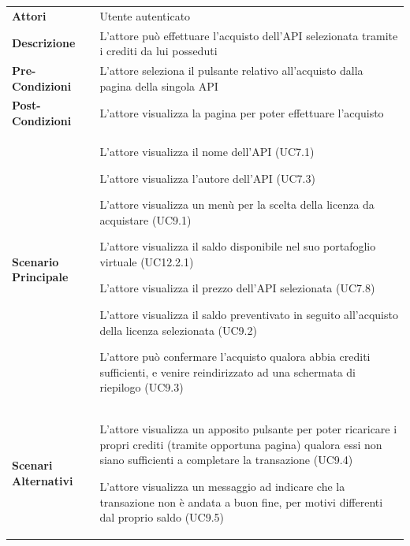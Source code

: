 \begin{longtable}{ l | p{11cm}}
	\hline
	\rowcolor{Gray}
	\multicolumn{2}{c}{UC9 - Acquisto API}\\
	\hline
	
	 \textbf{Attori} & Utente autenticato  \\
	\textbf{Descrizione} & L'attore può effettuare l'acquisto dell'API selezionata tramite i crediti da lui posseduti \\
	\textbf{Pre-Condizioni} & L'attore seleziona il pulsante relativo all'acquisto dalla pagina della singola API  \\
	\textbf{Post-Condizioni} & L'attore visualizza la pagina per poter effettuare l'acquisto\\
	\textbf{Scenario Principale} & 
	\begin{enumerate*}[label=(\arabic*.),itemjoin={\newline}]
		\item L'attore visualizza il nome dell'API (UC7.1)
		\item L'attore visualizza l'autore dell'API (UC7.3)
		\item L'attore visualizza un menù per la scelta della licenza da acquistare (UC9.1)
		\item L'attore visualizza il saldo disponibile nel suo portafoglio virtuale (UC12.2.1)
		\item L'attore visualizza il prezzo dell'API selezionata (UC7.8)
		\item L'attore visualizza il saldo preventivato in seguito all'acquisto della licenza selezionata (UC9.2)
		\item L'attore può confermare l'acquisto qualora abbia crediti sufficienti, e venire reindirizzato ad una schermata di riepilogo (UC9.3)
	\end{enumerate*}\\
	\textbf{Scenari Alternativi} & 
	\begin{enumerate*}[label=(\arabic*.),itemjoin={\newline}]
		\item L'attore visualizza un apposito pulsante per poter ricaricare i propri crediti (tramite opportuna pagina) qualora essi non siano sufficienti a completare la transazione (UC9.4)
		\item L'attore visualizza un messaggio ad indicare che la transazione non è andata a buon fine, per motivi differenti dal proprio saldo (UC9.5)
	\end{enumerate*}\\
\end{longtable}


